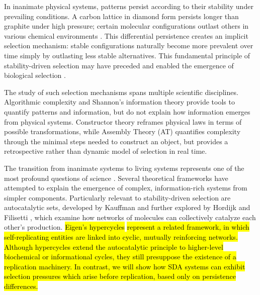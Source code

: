 \documentclass[preprint,12pt]{elsarticle}
\newcommand{\added}[1]{\hl{#1}}
\begin{document}
In inanimate physical systems, patterns persist according to their stability under prevailing conditions. A carbon lattice in diamond form persists longer than graphite under high pressure; certain molecular configurations outlast others in various chemical environments \cite{davies2006goldilocks}. This differential persistence creates an implicit selection mechanism: stable configurations naturally become more prevalent over time simply by outlasting less stable alternatives. This fundamental principle of stability-driven selection may have preceded and enabled the emergence of biological selection \cite{hordijk2012autocatalytic, nghe2015prebiotic}.

The study of such selection mechanisms spans multiple scientific disciplines. Algorithmic complexity \cite{kolmogorov1965complexity, chaitin1977algorithmic, solomonoff1964formal} and Shannon's information theory \cite{shannon1948mathematical} provide tools to quantify patterns and information, but do not explain how information emerges from physical systems. Constructor theory \cite{deutsch2013constructor} reframes physical laws in terms of possible transformations, while Assembly Theory (AT) \cite{walker2023nature} quantifies complexity through the minimal steps needed to construct an object, but provides a retrospective rather than dynamic model of selection in real time.

The transition from inanimate systems to living systems represents one of the most profound questions of science \cite{schrodinger1944life, pross2016life}. Several theoretical frameworks have attempted to explain the emergence of complex, information-rich systems from simpler components. Particularly relevant to stability-driven selection are autocatalytic sets, developed by Kauffman \cite{kauffman1986autocatalytic} and further explored by Hordijk and Filisetti \cite{hordijk2011required}, which examine how networks of molecules can collectively catalyze each other's production. \added{Eigen’s hypercycles }\cite{eigen} \added{represent a related framework, in which self-replicating entities are linked into cyclic, mutually reinforcing networks. Although hypercycles extend the autocatalytic principle to higher-level biochemical or informational cycles, they still presuppose the existence of a replication machinery. In contrast, we will show how SDA systems can exhibit selection pressures which arise before replication, based only on persistence differences.}
\end{document}
